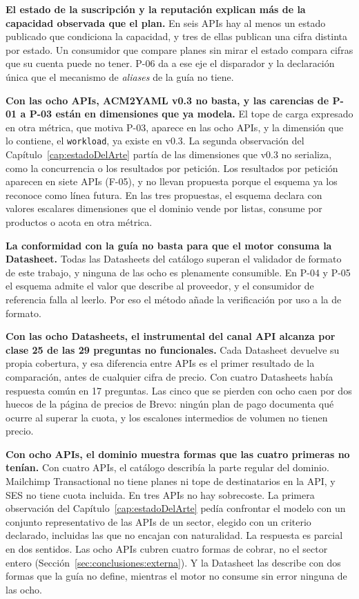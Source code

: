 \textbf{El estado de la suscripción y la reputación explican más de la capacidad observada que el plan.} En seis APIs hay al menos un estado publicado que condiciona la capacidad, y tres de ellas publican una cifra distinta por estado.
Un consumidor que compare planes sin mirar el estado compara cifras que su cuenta puede no tener.
P-06 da a ese eje el disparador y la declaración única que el mecanismo de \textit{aliases} de la guía no tiene.

\textbf{Con las ocho APIs, ACM2YAML v0.3 no basta, y las carencias de P-01 a P-03 están en dimensiones que ya modela.} El tope de carga expresado en otra métrica, que motiva P-03, aparece en las ocho APIs, y la dimensión que lo contiene, el \texttt{workload}, ya existe en v0.3.
La segunda observación del Capítulo~\ref{cap:estadoDelArte} partía de las dimensiones que v0.3 no serializa, como la concurrencia o los resultados por petición.
Los resultados por petición aparecen en siete APIs (F-05), y no llevan propuesta porque el esquema ya los reconoce como línea futura.
En las tres propuestas, el esquema declara con valores escalares dimensiones que el dominio vende por listas, consume por productos o acota en otra métrica.

\textbf{La conformidad con la guía no basta para que el motor consuma la Datasheet.} Todas las Datasheets del catálogo superan el validador de formato de este trabajo, y ninguna de las ocho es plenamente consumible.
En P-04 y P-05 el esquema admite el valor que describe al proveedor, y el consumidor de referencia falla al leerlo.
Por eso el método añade la verificación por uso a la de formato.

\textbf{Con las ocho Datasheets, el instrumental del canal API alcanza por clase 25 de las 29 preguntas no funcionales.} Cada Datasheet devuelve su propia cobertura, y esa diferencia entre APIs es el primer resultado de la comparación, antes de cualquier cifra de precio.
Con cuatro Datasheets había respuesta común en 17 preguntas.
Las cinco que se pierden con ocho caen por dos huecos de la página de precios de Brevo: ningún plan de pago documenta qué ocurre al superar la cuota, y los escalones intermedios de volumen no tienen precio.

\textbf{Con ocho APIs, el dominio muestra formas que las cuatro primeras no tenían.} Con cuatro APIs, el catálogo describía la parte regular del dominio.
Mailchimp Transactional no tiene planes ni tope de destinatarios en la API, y SES no tiene cuota incluida.
En tres APIs no hay sobrecoste.
La primera observación del Capítulo~\ref{cap:estadoDelArte} pedía confrontar el modelo con un conjunto representativo de las APIs de un sector, elegido con un criterio declarado, incluidas las que no encajan con naturalidad.
La respuesta es parcial en dos sentidos.
Las ocho APIs cubren cuatro formas de cobrar, no el sector entero (Sección~\ref{sec:conclusiones:externa}).
Y la Datasheet las describe con dos formas que la guía no define, mientras el motor no consume sin error ninguna de las ocho.
